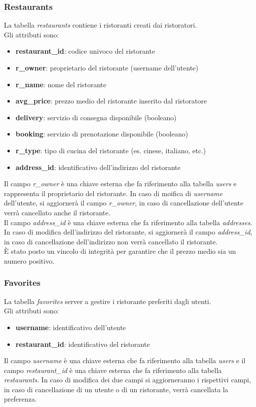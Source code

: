 \subsubsection{Restaurants}
\label{sec:restaurants}
La tabella \textit{restaurants} contiene i ristoranti creati 
dai ristoratori.\\
Gli attributi sono:
\begin{itemize}
    \item \textbf{restaurant\_id}: codice univoco del ristorante
    \item \textbf{r\_owner}: proprietario del ristorante (username dell'utente)
    \item \textbf{r\_name}: nome del ristorante
    \item \textbf{avg\_price}: prezzo medio del ristorante inserito dal ristoratore
    \item \textbf{delivery}: servizio di consegna disponibile (booleano)
    \item \textbf{booking}: servizio di prenotazione disponibile (booleano)
    \item \textbf{r\_type}: tipo di cucina del ristorante (es. cinese, italiano, etc.)
    \item \textbf{address\_id}: identificativo dell'indirizzo del ristorante
\end{itemize}
Il campo \textit{r\_owner} è una chiave esterna che fa riferimento
alla tabella \textit{users} e rappresenta il proprietario del ristorante.
In caso di moifica di \textit{username} dell'utente, si aggiornerà
il campo \textit{r\_owner}, in caso di cancellazione dell'utente 
verrà cancellato anche il ristorante.\\
Il campo \textit{address\_id} è una chiave esterna che fa riferimento
alla tabella \textit{addresses}.
In caso di modifica dell'indirizzo del ristorante, si aggiornerà
il campo \textit{address\_id}, in caso di cancellazione dell'indirizzo
non verrà cancellato il ristorante.\\
\`E stato posto un vincolo di integrità per garantire che il
prezzo medio sia un numero positivo.

\subsubsection{Favorites}
\label{sec:favorites}
La tabella \textit{favorites} server a gestire i 
ristorante preferiti dagli utenti.\\
Gli attributi sono:
\begin{itemize}
    \item \textbf{username}: identificativo dell'utente
    \item \textbf{restaurant\_id}: identificativo del ristorante
\end{itemize}
Il campo \textit{username} è una chiave esterna che fa riferimento
alla tabella \textit{users} e il campo \textit{restaurant\_id} 
è una chiave esterna che fa riferimento
alla tabella \textit{restaurants}. In caso di modifica dei due campi
si aggiorneranno i rispettivi campi, in caso di cancellazione
di un utente o di un ristorante, verrà cancellata la preferenza.

